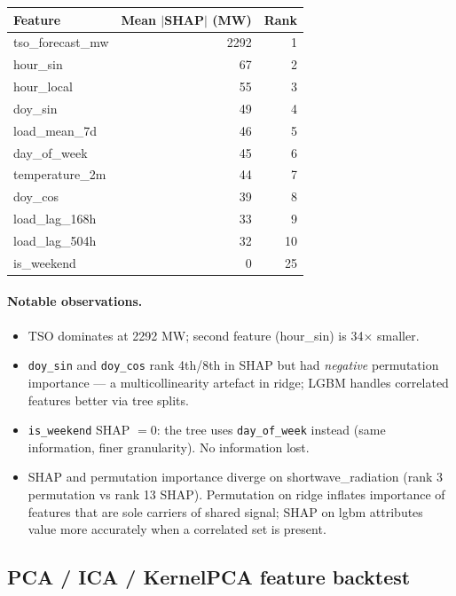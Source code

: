 \begin{center}
\begin{tabular}{lrr}
\toprule
Feature & Mean $|$SHAP$|$ (MW) & Rank \\
\midrule
tso\_forecast\_mw    & 2292 & 1 \\
hour\_sin            &   67 & 2 \\
hour\_local          &   55 & 3 \\
doy\_sin             &   49 & 4 \\
load\_mean\_7d       &   46 & 5 \\
day\_of\_week        &   45 & 6 \\
temperature\_2m      &   44 & 7 \\
doy\_cos             &   39 & 8 \\
load\_lag\_168h      &   33 & 9 \\
load\_lag\_504h      &   32 & 10 \\
is\_weekend          &    0 & 25 \\
\bottomrule
\end{tabular}
\end{center}

\paragraph{Notable observations.}
\begin{itemize}
  \item TSO dominates at 2292 MW; second feature (hour\_sin) is 34$\times$ smaller.
  \item \texttt{doy\_sin} and \texttt{doy\_cos} rank 4th/8th in SHAP but had
        \emph{negative} permutation importance --- a multicollinearity artefact
        in ridge; LGBM handles correlated features better via tree splits.
  \item \texttt{is\_weekend} SHAP $= 0$: the tree uses \texttt{day\_of\_week}
        instead (same information, finer granularity). No information lost.
  \item SHAP and permutation importance diverge on shortwave\_radiation
        (rank 3 permutation vs rank 13 SHAP). Permutation on ridge inflates
        importance of features that are sole carriers of shared signal; SHAP on
        lgbm attributes value more accurately when a correlated set is present.
\end{itemize}

\subsection{PCA / ICA / KernelPCA feature backtest}
\label{sec:pca_feat_bt}

